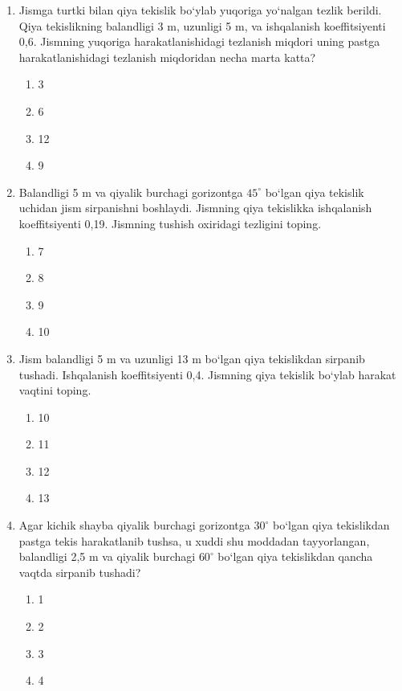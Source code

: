 \begin{enumerate}
\item Jismga turtki bilan qiya tekislik bo‘ylab yuqoriga
yo‘nalgan tezlik berildi.
Qiya tekislikning balandligi 3 m, uzunligi 5 m,
va ishqalanish koeffitsiyenti 0,6.
Jismning yuqoriga harakatlanishidagi tezlanish
miqdori uning pastga harakatlanishidagi
tezlanish miqdoridan necha marta katta?

\begin{enumerate}[label=\Alph*)]
\item 3
\item 6
\item 12
\item 9
\end{enumerate}

\item Balandligi 5 m va qiyalik burchagi gorizontga
$45^\circ$ bo‘lgan qiya tekislik uchidan jism
sirpanishni boshlaydi.
Jismning qiya tekislikka ishqalanish koeffitsiyenti 0,19.
Jismning tushish oxiridagi tezligini toping.

\begin{enumerate}[label=\Alph*)]
\item 7
\item 8
\item 9
\item 10
\end{enumerate}

\item Jism balandligi 5 m va uzunligi 13 m
bo‘lgan qiya tekislikdan sirpanib tushadi.
Ishqalanish koeffitsiyenti 0,4.
Jismning qiya tekislik bo‘ylab
harakat vaqtini toping.

\begin{enumerate}[label=\Alph*)]
\item 10
\item 11
\item 12
\item 13
\end{enumerate}

\item Agar kichik shayba qiyalik burchagi
gorizontga $30^\circ$ bo‘lgan qiya tekislikdan
pastga tekis harakatlanib tushsa,
u xuddi shu moddadan tayyorlangan,
balandligi 2,5 m va qiyalik burchagi
$60^\circ$ bo‘lgan qiya tekislikdan
qancha vaqtda sirpanib tushadi?

\begin{enumerate}[label=\Alph*)]
\item 1
\item 2
\item 3
\item 4
\end{enumerate}


\end{enumerate}

